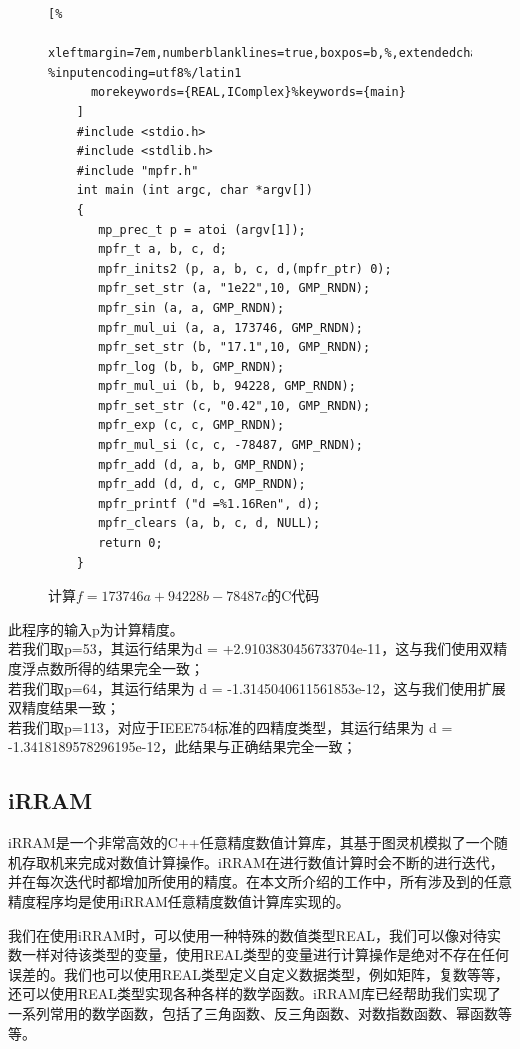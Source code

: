 \begin{figure}[thbp]
    \begin{lstlisting}[%
      xleftmargin=7em,numberblanklines=true,boxpos=b,%,extendedchars=\true, %inputencoding=utf8%/latin1
      morekeywords={REAL,IComplex}%keywords={main}
    ]
    #include <stdio.h>
    #include <stdlib.h>
    #include "mpfr.h"
    int main (int argc, char *argv[])
    {
       mp_prec_t p = atoi (argv[1]);
       mpfr_t a, b, c, d;
       mpfr_inits2 (p, a, b, c, d,(mpfr_ptr) 0);
       mpfr_set_str (a, "1e22",10, GMP_RNDN);
       mpfr_sin (a, a, GMP_RNDN);
       mpfr_mul_ui (a, a, 173746, GMP_RNDN);
       mpfr_set_str (b, "17.1",10, GMP_RNDN);
       mpfr_log (b, b, GMP_RNDN);
       mpfr_mul_ui (b, b, 94228, GMP_RNDN);
       mpfr_set_str (c, "0.42",10, GMP_RNDN);
       mpfr_exp (c, c, GMP_RNDN);
       mpfr_mul_si (c, c, -78487, GMP_RNDN);
       mpfr_add (d, a, b, GMP_RNDN);
       mpfr_add (d, d, c, GMP_RNDN);
       mpfr_printf ("d =%1.16Ren", d);
       mpfr_clears (a, b, c, d, NULL);
       return 0;
    }
    \end{lstlisting}
    \caption{计算$f = 173746a + 94228b - 78487c$的C代码}
    \label{lst:arbiexmpfrcode}
\end{figure}

此程序的输入p为计算精度。\\
若我们取p=53，其运行结果为d = +2.9103830456733704e-11，这与我们使用双精度浮点数所得的结果完全一致；\\
若我们取p=64，其运行结果为 d = -1.3145040611561853e-12，这与我们使用扩展双精度结果一致；\\
若我们取p=113，对应于IEEE754标准的四精度类型，其运行结果为 d = -1.3418189578296195e-12，此结果与正确结果完全一致；

\subsection{iRRAM}

iRRAM是一个非常高效的C++任意精度数值计算库，其基于图灵机模拟了一个随机存取机来完成对数值计算操作。iRRAM在进行数值计算时会不断的进行迭代，并在每次迭代时都增加所使用的精度。在本文所介绍的工作中，所有涉及到的任意精度程序均是使用iRRAM任意精度数值计算库实现的。

我们在使用iRRAM时，可以使用一种特殊的数值类型REAL，我们可以像对待实数一样对待该类型的变量，使用REAL类型的变量进行计算操作是绝对不存在任何误差的。我们也可以使用REAL类型定义自定义数据类型，例如矩阵，复数等等，还可以使用REAL类型实现各种各样的数学函数。iRRAM库已经帮助我们实现了一系列常用的数学函数，包括了三角函数、反三角函数、对数指数函数、幂函数等等。

